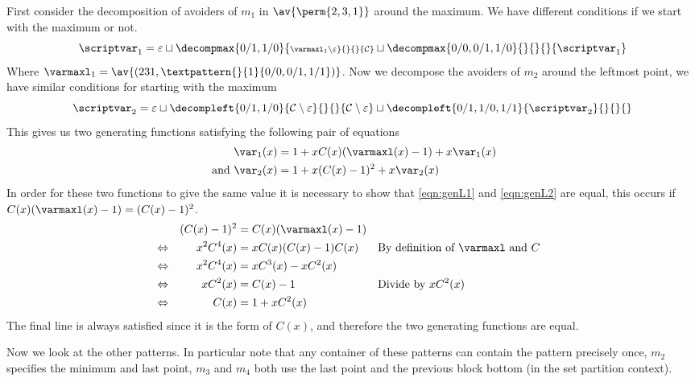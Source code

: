 First consider the decomposition of avoiders of \(m_1\) in \(\av{\perm{2,3,1}}\)
around the maximum. We have different conditions if we start with the maximum or not.
\begin{equation*}
    \scriptvar_1 =
    \varepsilon \sqcup
    \decompmax{0/1,1/0}{\scriptstyle \mathcal{\varmaxl}_1\setminus\varepsilon}{}{}{\mathcal{C}}
    \sqcup
    \decompmax{0/0,0/1,1/0}{}{}{}{\scriptvar_1}
\end{equation*}
Where \(\mathcal{\varmaxl}_1 = \av{(231,\textpattern{}{1}{0/0,0/1,1/1})}\).
Now we decompose the avoiders of \(m_2\) around the leftmost point, we have similar
conditions for starting with the maximum
\begin{equation*}
    \scriptvar_2 =
    \varepsilon \sqcup
    \decompleft{0/1,1/0}{\mathcal{C}\setminus\varepsilon}{}{}{\mathcal{C}\setminus\varepsilon}
    \sqcup
    \decompleft{0/1,1/0,1/1}{\scriptvar_2}{}{}{}
\end{equation*}
This gives us two generating functions satisfying the following pair of equations
\begin{align}
    \var_1(x) &= 1 + xC(x)(\varmaxl(x)-1) +x\var_1(x) \label{eqn:genL1}\\
    \text{ and }\var_2(x) &= 1 + x(C(x)-1)^2 + x\var_2(x) \label{eqn:genL2}
\end{align}
In order for these two functions to give the same value it is necessary to show that
\eqref{eqn:genL1} and \eqref{eqn:genL2} are equal, this occurs if
\(C(x)(\varmaxl(x)-1) = (C(x)-1)^2\).
\begin{align*}
    &&(C(x)-1)^2 &= C(x)(\varmaxl(x)-1)\\
        &\Leftrightarrow& x^2C^4(x) &=  xC(x)(C(x)-1)C(x) &&\text{By definition of \(\varmaxl\) and \(C\)}\\
        &\Leftrightarrow& x^2C^4(x)&=xC^3(x)-xC^2(x)\\
        &\Leftrightarrow& xC^2(x) &= C(x) -1 &&\text{Divide by \(xC^2(x)\)}\\
        &\Leftrightarrow& C(x) &= 1 +xC^2(x)
\end{align*}
The final line is always satisfied since it is the form of \(C(x)\), and
therefore the two generating functions are equal.

Now we look at the other patterns. In particular note that any container of these
patterns can contain the pattern precisely once, \(m_2\) specifies the
minimum and last point, \(m_3\) and \(m_4\) both use the last point and the
previous block bottom (in the set partition context).

